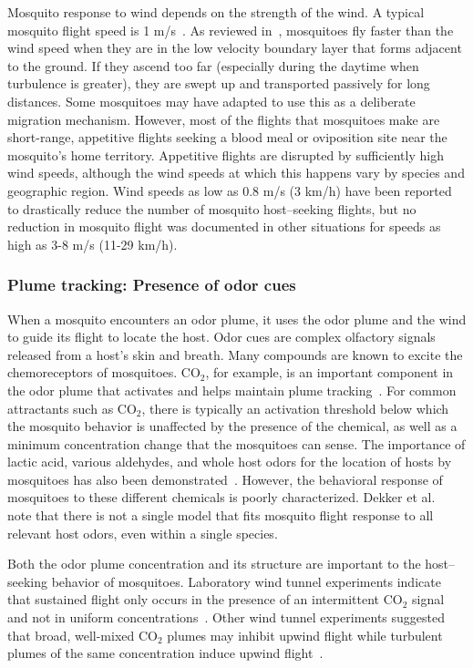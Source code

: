 \documentclass[10pt]{article}
\begin{document}
Mosquito response to wind depends on the strength of the wind. A typical mosquito flight speed is 1 m/s~\cite{Clements1999,Gibson1999}. As reviewed in~\cite{Service1980}, mosquitoes fly faster than the wind speed when they are in the low velocity boundary layer that forms adjacent to the ground. If they ascend too far (especially during the daytime when turbulence is greater), they are swept up and transported passively for long distances.  Some mosquitoes may have adapted to use this as a deliberate migration mechanism. However, most of the flights that mosquitoes make are 
short-range, appetitive flights seeking a blood meal or oviposition site near the mosquito's home territory. Appetitive flights are disrupted by sufficiently high wind speeds, although the wind speeds at which this happens vary by species and geographic region. Wind speeds as low as 0.8 m/s (3 km/h) have been reported to drastically reduce the number of mosquito host--seeking flights, but no reduction in mosquito flight was documented in other situations for speeds as high as 3-8 m/s (11-29 km/h).


\subsubsection*{Plume tracking: Presence of odor cues}
When a mosquito encounters an odor plume, it uses the odor plume and the wind to guide its flight to locate the host.
Odor cues are complex olfactory signals released from a host's skin and breath. Many compounds are known to excite the chemoreceptors of mosquitoes.
CO$_2$, for example, is an important component in the odor plume that activates and helps maintain plume tracking~\cite{Bowen1991,Gibson1999,Gillies1980}. 
For common attractants such as CO$_2$, there is typically an activation threshold below which the mosquito behavior is unaffected by the presence of the chemical, as well as a minimum concentration change that the mosquitoes can sense. The importance of lactic acid, various
aldehydes, and whole host odors for the location of hosts by mosquitoes has also been demonstrated~\cite{Bowen1991,Syed2009,Dekker2005,Dekker2011}. However, the behavioral response of mosquitoes to these different chemicals is poorly characterized. Dekker et al.~\cite{Dekker2011} note that there is not a single model that fits mosquito flight response to all relevant host odors, even within a single species.

Both the odor plume concentration and its structure are important to the  host--seeking behavior of mosquitoes. Laboratory wind tunnel experiments indicate that
sustained flight only occurs in the presence of an intermittent CO$_2$ signal and not in uniform
concentrations~\cite{Gillies1980}.  Other wind tunnel experiments suggested that broad,
well-mixed CO$_2$ plumes may inhibit upwind flight while turbulent plumes of the same concentration induce
upwind flight~\cite{Dekker2001,Dekker2005,Dekker2011}.
\end{document}
